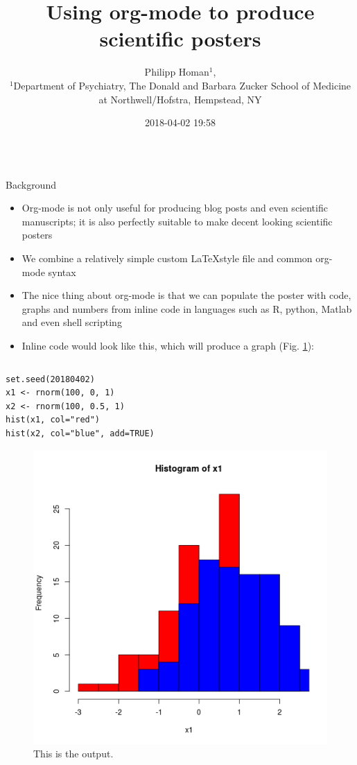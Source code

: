 \documentclass[final]{beamer}
\date{}
\author{
Philipp Homan$^{1}$,
\\
\normalsize{$^{1}$Department of Psychiatry,}
\normalsize{The Donald and Barbara Zucker}
\normalsize{School of Medicine at Northwell/Hofstra,}
\normalsize{Hempstead, NY}
}
\date{2018-04-02 19:58}
\title{Using org-mode to produce scientific posters}
\begin{document}
\begin{frame}[fragile,label={sec:org10a116a}]{}
 \begin{columns}
\begin{column}[t]{0.45\columnwidth}
\begin{block}{Background}
\begin{itemize}
\item Org-mode is not only useful for producing blog posts and even
scientific manuscripts; it is also perfectly suitable to make 
decent looking scientific posters
\item We combine a relatively simple custom \LaTeX style file and common
org-mode syntax
\item The nice thing about org-mode is that we can populate the poster with
code, graphs and numbers from inline code in languages such as R,
python, Matlab and even shell scripting
\item Inline code would look like this, which will produce a graph
(Fig. \ref{fig:org8cce396}):
\end{itemize}

\begin{columns}
\begin{column}[T]{0.48\columnwidth}
\begin{verbatim}
set.seed(20180402)
x1 <- rnorm(100, 0, 1)
x2 <- rnorm(100, 0.5, 1)
hist(x1, col="red")
hist(x2, col="blue", add=TRUE)
\end{verbatim}

\begin{figure}[htbp]
\centering
\includegraphics[width=.9\linewidth]{3.png}
\caption{\label{fig:org8cce396}
This is the output.}
\end{figure}
\end{column}
\end{columns}
\end{block}


\end{column}
\end{columns}
\end{frame}
\end{document}
